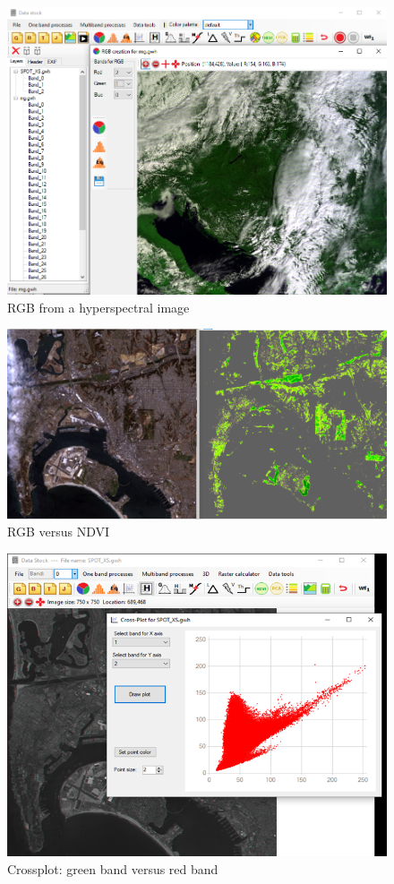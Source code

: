 \documentclass[a4paper,12pt]{article}
\begin{document}
	\begin{figure}
	\centering
	\includegraphics[width=12cm]{ds1.png}
	\caption{RGB  from a hyperspectral image}
	\label{fig:ds1}
	\end{figure}

	\begin{figure}
	\centering
	\includegraphics[width=12cm]{ndvi.png}
	\caption{RGB versus NDVI}
	\label{fig:ndvi}
	\end{figure}

	\begin{figure}
	\centering
	\includegraphics[width=12cm]{crossplot.png}
	\caption{Crossplot: green band versus red band}
	\label{fig:crossplot}
	\end{figure}
\end{document}
